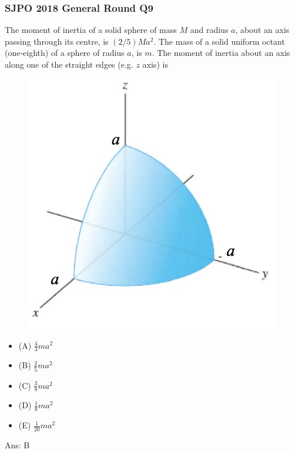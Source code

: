 \documentclass{article}
\begin{document}
\subsubsection{SJPO 2018 General Round Q9}
The moment of inertia of a solid sphere of mass $M$ and radius $a$, about an axis passing through its centre, is $(2 / 5) M a^2$. The mass of a solid uniform octant (one-eighth) of a sphere of radius $a$, is $m$. The moment of inertia about an axis along one of the straight edges (e.g. $z$ axis) is\\
\begin{figure}
\includegraphics[width=1.0\linewidth]{images/sjpo2018q9.png}
\end{figure}
\begin{itemize}
\item[](A) $\frac{4}{3} m a^2$
\item[](B) $\frac{2}{5} m a^2$
\item[](C) $\frac{3}{8} m a^2$
\item[](D) $\frac{1}{8} m a^2$
\item[](E) $\frac{1}{20} m a^2$
\end{itemize}
Ans: \ifpaper B \fi 
\newpage \clearpage
\end{document}
